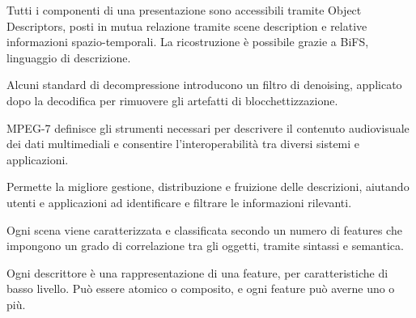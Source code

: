 Tutti i componenti di una presentazione sono accessibili tramite Object Descriptors, posti in mutua relazione tramite scene description e relative informazioni spazio-temporali. La ricostruzione è possibile grazie a BiFS, linguaggio di descrizione.

Alcuni standard di decompressione introducono un filtro di denoising, applicato dopo la decodifica per rimuovere gli artefatti di blocchettizzazione. 

MPEG-7 definisce gli strumenti necessari per descrivere il contenuto audiovisuale dei dati multimediali e consentire l'interoperabilità tra diversi sistemi e applicazioni. 

Permette la migliore gestione, distribuzione e fruizione delle descrizioni, aiutando utenti e applicazioni ad identificare e filtrare le informazioni rilevanti.

Ogni scena viene caratterizzata e classificata secondo un numero di features che impongono un grado di correlazione tra gli oggetti, tramite sintassi e semantica.

Ogni descrittore è una rappresentazione di una feature, per caratteristiche di basso livello. Può essere atomico o composito, e ogni feature può averne uno o più.
